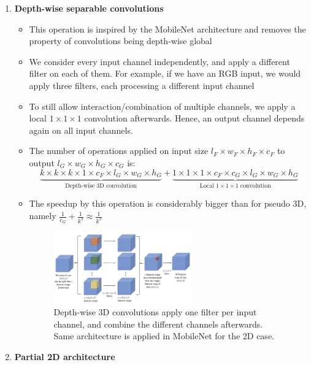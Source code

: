 \begin{enumerate}
	\item \textbf{Depth-wise separable convolutions}
	\begin{itemize}
		\item This operation is inspired by the MobileNet architecture and removes the property of convolutions being depth-wise global
		\item We consider every input channel independently, and apply a different filter on each of them. For example, if we have an RGB input, we would apply three filters, each processing a different input channel
		\item To still allow interaction/combination of multiple channels, we apply a local $1\times 1\times 1$ convolution afterwards. Hence, an output channel depends again on all input channels.
		\item The number of operations applied on input size $l_F \times w_F \times h_F \times c_F$ to output $l_G \times w_G \times h_G \times c_G$ is:
		\begin{equation*}
			\underbrace{k \times k \times k \times 1 \times c_F \times l_G \times w_G \times h_G}_{\text{Depth-wise 3D convolution}} + \underbrace{1\times 1\times 1 \times c_F \times c_G \times l_G \times w_G \times h_G}_{\text{Local }1\times 1\times 1\text{ convolution}}
		\end{equation*}
		\item The speedup by this operation is considerably bigger than for pseudo 3D, namely $\frac{1}{c_G} + \frac{1}{k^{3}} \approx \frac{1}{k^{3}}$
		\begin{figure}[ht!]
			\centering
			\includegraphics[width=0.6\textwidth]{figures/cv_deep_video_3D_depthwise_conv.png}
			\caption{Depth-wise 3D convolutions apply one filter per input channel, and combine the different channels afterwards. Same architecture is applied in MobileNet for the 2D case.}
			\label{fig:deep_video_depthwise_3D_convs}
		\end{figure}
	\end{itemize}
	\item \textbf{Partial 2D architecture} 
	\begin{itemize}

\end{itemize}
\end{enumerate}
